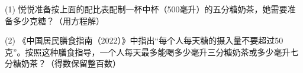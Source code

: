 \documentclass[DIN, pagenumber=false, fontsize=11pt, parskip=half]{scrartcl}
\begin{document}
\begin{enumerate}
(1) 悦悦准备按上面的配比表配制一杯中杯（500毫升）的五分糖奶茶，她需要准备多少克糖？（用方程解）

\vspace{1cm}

(2) 《中国居民膳食指南（2022）》中指出“每个人每天糖的摄入量不要超过50克”。按照这种膳食指导，一个人每天最多能喝多少毫升三分糖奶茶或多少毫升七分糖奶茶？（得数保留整百数）
\end{enumerate}
\end{document}
